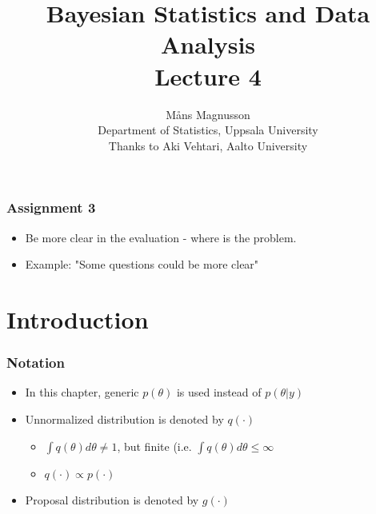 \documentclass[10pt]{beamer}
\title[]{{\color{black}Bayesian Statistics and Data Analysis \\ Lecture 4}}
\author[]{M{\aa}ns Magnusson \\ Department of Statistics, Uppsala University \\ Thanks to Aki Vehtari, Aalto University}
\date{}
\begin{document}
\frame{\titlepage
}






\begin{frame}

\frametitle{Assignment 3}

  \begin{itemize}
  \item Be more clear in the evaluation - where is the problem.
  \item Example: "Some questions could be more clear"%
  \end{itemize}

\end{frame}

\section{Introduction}

\begin{frame}

\frametitle{Notation}

  \begin{itemize}
  \item In this chapter, generic $p(\theta)$ is used instead of
    $p(\theta|y)$
  \item Unnormalized distribution is denoted by $q(\cdot)$
    \begin{itemize}
    \item $\int q(\theta) d\theta \neq 1$, but finite (i.e. $\int q(\theta) d\theta \le \infty$
    \item $q(\cdot) \propto p(\cdot)$
    \end{itemize}
  \item Proposal distribution is denoted by $g(\cdot)$
  \end{itemize}

\end{frame}
\end{document}
